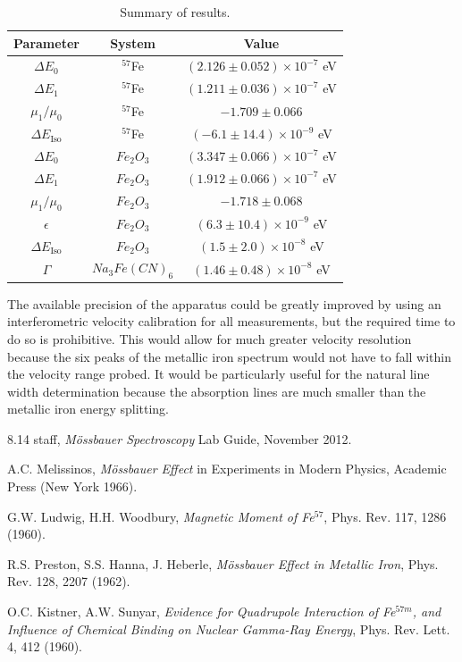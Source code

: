 \begin{table}[h]
\caption{\label{tab:end} Summary of results.}
\begin{tabular}{|c|c|c|}
\hline
Parameter & System & Value \\
\hline
$\Delta E_0$ & $^{57}$Fe & $(2.126\pm0.052)\times 10^{-7}$ eV \\
\hline
$\Delta E_1$ & $^{57}$Fe & $(1.211\pm0.036)\times 10^{-7}$ eV \\
\hline
$\mu_1 / \mu_0$ & $^{57}$Fe & $-1.709\pm0.066$ \\
\hline
$\Delta E_{\mathrm{Iso}} $ & $^{57}$Fe & $(-6.1\pm14.4)\times 10^{-9}$ eV \\
\hline
$\Delta E_0$ & $Fe_2 O_3$ & $(3.347\pm0.066)\times 10^{-7}$ eV\\
\hline
$\Delta E_1$ & $Fe_2 O_3$ & $(1.912\pm0.066)\times 10^{-7}$ eV \\
\hline
$\mu_1 / \mu_0$ & $Fe_2 O_3$ & $-1.718\pm0.068$ \\
\hline
$\epsilon$ & $Fe_2 O_3$ & $(6.3\pm10.4)\times 10^{-9}$ eV\\
\hline 
$\Delta E_{\mathrm{Iso}} $ & $Fe_2 O_3$ & $(1.5 \pm 2.0)\times 10^{-8}$ eV \\
\hline
$\Gamma $ & $Na_3Fe(CN)_6$ & $(1.46\pm0.48)\times 10^{-8}$ eV \\
\hline
\end{tabular}
\end{table}

The available precision of the apparatus could be greatly improved by using an interferometric velocity calibration for all measurements, but the required time to do so is prohibitive. This would allow for much greater velocity resolution because the six peaks of the metallic iron spectrum would not have to fall within the velocity range probed. It would be particularly useful for the natural line width determination because the absorption lines are much smaller than the metallic iron energy splitting.

\begin{thebibliography}{3}

8.14 staff, \emph{M{\"o}ssbauer Spectroscopy} Lab Guide, November 2012. 

A.C. Melissinos, \emph{M{\"o}ssbauer Effect} in Experiments in Modern Physics, Academic Press (New York 1966). 

G.W. Ludwig, H.H. Woodbury, \emph{Magnetic Moment of Fe$^{57}$}, Phys. Rev. 117, 1286 (1960).

R.S. Preston, S.S. Hanna, J. Heberle, \emph{M{\"o}ssbauer Effect in Metallic Iron}, Phys. Rev. 128, 2207 (1962). 

O.C. Kistner, A.W. Sunyar, \emph{Evidence for Quadrupole Interaction of Fe$^{57m}$, and Influence of Chemical Binding on Nuclear Gamma-Ray Energy}, Phys. Rev. Lett. 4, 412 (1960).

\end{thebibliography}



